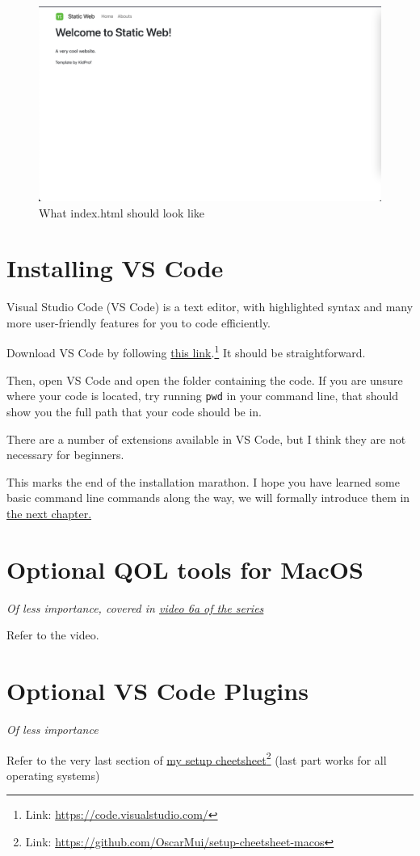 \begin{figure}[h]
\centering
\includegraphics[width=15cm]{images/ch1-indexhtml.png}
\caption{What index.html should look like}
\end{figure}


\section{Installing VS Code}

Visual Studio Code (VS Code) is a text editor, with highlighted syntax and many more user-friendly features for you to code efficiently.

Download VS Code by following \href{https://code.visualstudio.com/}{this link}.\footnote{Link: \url{https://code.visualstudio.com/}} It should be straightforward.

\label{sec:pwdch1}
Then, open VS Code and open the folder containing the code. If you are unsure where your code is located, try running \texttt{pwd} in your command line, that should show you the full path that your code should be in.

There are a number of extensions available in VS Code, but I think they are not necessary for beginners.
\vspace{6mm}

This marks the end of the installation marathon. I hope you have learned some basic command line commands along the way, we will formally introduce them in \hyperref[sec:cmd]{the next chapter.}

\section{Optional QOL tools for MacOS}
\textit{Of less importance, covered in \href{https://www.youtube.com/watch?v=ZIBEVGrtiVA&list=PLjGmdnqrOKuYXiu7lgG5HW71jPEUd1XCm&index=7}{video 6a of the series}}
\vspace{6mm}

Refer to the video.

\section{Optional VS Code Plugins}
\textit{Of less importance}
\vspace{6mm}

Refer to the very last section of \href{https://github.com/OscarMui/setup-cheetsheet-macos}{my setup cheetsheet}\footnote{Link: \url{https://github.com/OscarMui/setup-cheetsheet-macos}} (last part works for all operating systems)
